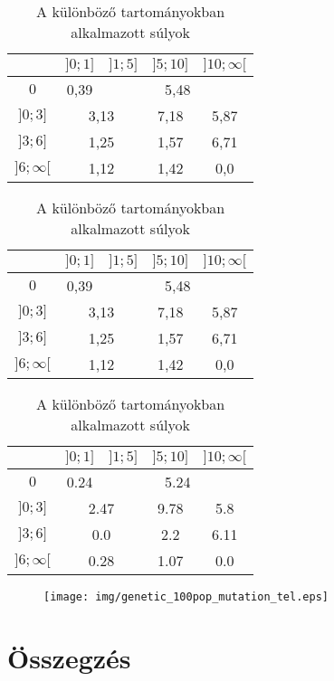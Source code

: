 \documentclass[12pt]{article}
\begin{document}
\begin{table}[H]
	\centering
	\begin{subtable}{0.49\textwidth}
		\begin{tabular}{|c|c|c|c|c|}
			\hline
			\diagbox[width=1.5cm,height=1.2cm]{$\sigma_{cs}$}{$n_{cs}$} & $]0;1]$ & $]1;5]$ & $]5;10]$ & $]10;\infty[$  \\
			\hline
			$0$ & 0,39 & \multicolumn{3}{|c|}{5,48} \\
			\hline
			$]0;3]$ & \multicolumn{2}{|c|}{3,13} & 7,18 & 5,87 \\
			\hline
			$]3;6]$ & \multicolumn{2}{|c|}{1,25} & 1,57 & 6,71 \\
			\hline
			$]6;\infty[$  & \multicolumn{2}{|c|}{1,12} & 1,42 & 0,0 \\
			\hline
		\end{tabular}
	\end{subtable}
	\begin{subtable}{0.49\textwidth}
		\begin{tabular}{|c|c|c|c|c|}
			\hline
			\diagbox[width=1.5cm,height=1.2cm]{$\sigma_{cs}$}{$n_{cs}$} & $]0;1]$ & $]1;5]$ & $]5;10]$ & $]10;\infty[$  \\
			\hline
			$0$ & 0,39 & \multicolumn{3}{|c|}{5,48} \\
			\hline
			$]0;3]$ & \multicolumn{2}{|c|}{3,13} & 7,18 & 5,87 \\
			\hline
			$]3;6]$ & \multicolumn{2}{|c|}{1,25} & 1,57 & 6,71 \\
			\hline
			$]6;\infty[$  & \multicolumn{2}{|c|}{1,12} & 1,42 & 0,0 \\
			\hline
		\end{tabular}
	\end{subtable}
	\caption{A különböző tartományokban alkalmazott súlyok}
\end{table}
\begin{table}[H]
	\centering
	\begin{tabular}{|c|c|c|c|c|}
		\hline
		\diagbox{$\sigma_{cs}$}{$n_{cs}$} & $]0;1]$ & $]1;5]$ & $]5;10]$ & $]10;\infty[$  \\
		\hline
		$0$ & 0.24 & \multicolumn{3}{|c|}{5.24} \\
		\hline
		$]0;3]$ & \multicolumn{2}{|c|}{2.47} & 9.78 & 5.8 \\
		\hline
		$]3;6]$ & \multicolumn{2}{|c|}{0.0} & 2.2 & 6.11 \\
		\hline
		$]6;\infty[$  & \multicolumn{2}{|c|}{0.28} & 1.07 & 0.0 \\
		\hline
	\end{tabular}
	\caption{A különböző tartományokban alkalmazott súlyok}
\end{table}
\begin{figure}[H]
	\centering
	\texttt{[image: img/genetic\_100pop\_mutation\_tel.eps]}
\end{figure}
\section{Összegzés}

\end{document}
